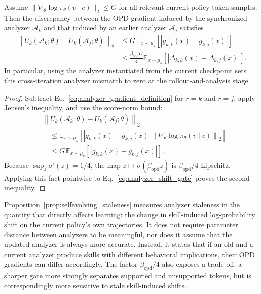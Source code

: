 \begin{proposition}
\label{prop:selfevolving_staleness}
Assume
$\|\nabla_\theta\log\pi_\theta(v\mid c)\|_2\le G$
for all relevant current-policy token samples. Then the discrepancy between the OPD gradient induced by the synchronized analyzer $\mathcal A_k$ and that induced by an earlier analyzer $\mathcal A_j$ satisfies
\begin{equation}
 \begin{aligned}
 \left\|
 U_k(\mathcal A_k;\theta)
 -
 U_k(\mathcal A_j;\theta)
 \right\|_2
 &\le
 G\,
 \mathbb E_{x\sim\mu_k}
 \left[
 |g_{k,k}(x)-g_{k,j}(x)|
 \right]
 \\
 &\le
 \frac{\beta_{\mathrm{opd}}G}{4}
 \mathbb E_{x\sim\mu_k}
 \left[
 |\Delta_{k,k}(x)-\Delta_{k,j}(x)|
 \right].
 \end{aligned}
 \label{eq:analyzer_staleness_bound}
\end{equation}
In particular, using the analyzer instantiated from the current checkpoint sets this cross-iteration analyzer mismatch to zero at the rollout-and-analysis stage.
\end{proposition}

\begin{proof}
Subtract Eq.~\ref{eq:analyzer_gradient_definition} for $r=k$ and $r=j$, apply Jensen's inequality, and use the score-norm bound:
\begin{align*}
 &\left\|
 U_k(\mathcal A_k;\theta)
 -
 U_k(\mathcal A_j;\theta)
 \right\|_2
 \\
 &\quad\le
 \mathbb E_{x\sim\mu_k}
 \left[
 |g_{k,k}(x)-g_{k,j}(x)|
 \left\|
 \nabla_\theta\log\pi_\theta(v\mid c)
 \right\|_2
 \right]
 \\
 &\quad\le
 G\,
 \mathbb E_{x\sim\mu_k}
 \left[
 |g_{k,k}(x)-g_{k,j}(x)|
 \right].
\end{align*}
Because
$\sup_z\sigma'(z)=1/4$,
the map $z\mapsto\sigma(\beta_{\mathrm{opd}}z)$ is
$\beta_{\mathrm{opd}}/4$-Lipschitz. Applying this fact pointwise to Eq.~\ref{eq:analyzer_shift_gate} proves the second inequality.
\end{proof}

Proposition~\ref{prop:selfevolving_staleness} measures analyzer staleness in the quantity that directly affects learning: the change in skill-induced log-probability shift on the current policy's own trajectories. It does not require parameter distance between analyzers to be meaningful, nor does it assume that the updated analyzer is always more accurate. Instead, it states that if an old and a current analyzer produce skills with different behavioral implications, their OPD gradients can differ accordingly. The factor $\beta_{\mathrm{opd}}/4$ also exposes a trade-off: a sharper gate more strongly separates supported and unsupported tokens, but is correspondingly more sensitive to stale skill-induced shifts.

